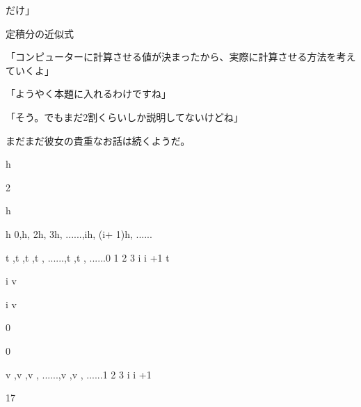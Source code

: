 だけ」\par
定積分の近似式\par
「コンピューターに計算させる値が決まったから、実際に計算させる⽅法を考えていくよ」\par
「ようやく本題に⼊れるわけですね」\par
「そう。でもまだ2割くらいしか説明してないけどね」\par
まだまだ彼⼥の貴重なお話は続くようだ。\par
h\par
2\par
h\par
h 0,h, 2h, 3h, ......,ih, (i+ 1)h, ......\par
t  ,t  ,t  ,t  , ......,t  ,t  , ......0 1 2 3 i i +1 t\par
i v\par
i v\par
0\par
0\par
v  ,v  ,v  , ......,v  ,v  , ......1 2 3 i i +1\par
17\par

